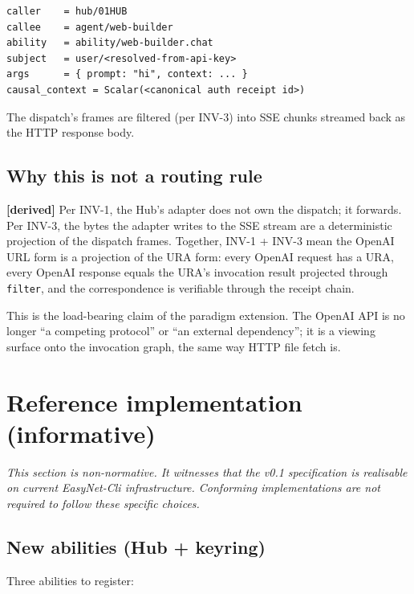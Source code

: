 \documentclass[11pt,a4paper]{article}
\newcommand{\derived}{\textcolor{derivedcolor}{\textbf{[derived]}}\xspace}
\theoremstyle{definition}
\begin{document}
\begin{lstlisting}
caller    = hub/01HUB
callee    = agent/web-builder
ability   = ability/web-builder.chat
subject   = user/<resolved-from-api-key>
args      = { prompt: "hi", context: ... }
causal_context = Scalar(<canonical auth receipt id>)
\end{lstlisting}

The dispatch's frames are filtered (per INV-3) into SSE chunks
streamed back as the HTTP response body.

\subsection{Why this is not a routing rule}

\derived{} Per INV-1, the Hub's adapter does not own the
dispatch; it forwards. Per INV-3, the bytes the adapter writes
to the SSE stream are a deterministic projection of the
dispatch frames. Together, INV-1 + INV-3 mean the OpenAI URL
form is a projection of the URA form: every OpenAI request has
a URA, every OpenAI response equals the URA's invocation result
projected through \texttt{filter}, and the correspondence is
verifiable through the receipt chain.

This is the load-bearing claim of the paradigm extension. The
OpenAI API is no longer ``a competing protocol'' or ``an
external dependency''; it is a viewing surface onto the
invocation graph, the same way HTTP file fetch is.

\section{Reference implementation (informative)}
\label{sec:ref-impl}

\textit{This section is non-normative. It witnesses that the
v0.1 specification is realisable on current EasyNet-Cli
infrastructure. Conforming implementations are not required to
follow these specific choices.}

\subsection{New abilities (Hub + keyring)}

Three abilities to register:
\end{document}

